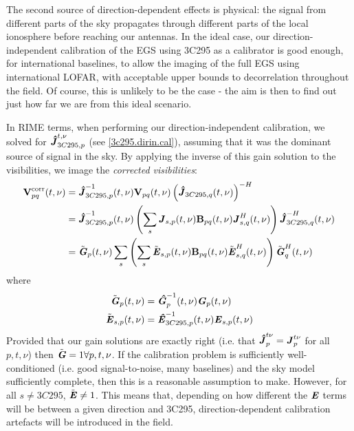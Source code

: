 \pg
The second source of direction-dependent effects is physical: the signal from different parts of the sky propagates through different parts of the local ionosphere before reaching our antennas. In the ideal case, our direction-independent calibration of the EGS using 3C295 as a calibrator is good enough, for international baselines, to allow the imaging of the full EGS using international LOFAR, with acceptable upper bounds to decorrelation throughout the field. Of course, this is unlikely to be the case - the aim is then to find out just how far we are from this ideal scenario.

\pg
In RIME terms, when performing our direction-independent calibration, we solved for $\textbf{\emph{\^{J}}}_{3C295,p}^{t,\nu}$ (see \cref{3c295.dirin.cal}), assuming that it was the dominant source of signal in the sky. By applying the inverse of this gain solution to the visibilities, we image the \textit{corrected visibilities}:
\begin{align}
\textbf{V}_{pq}^\mathrm{corr} (t,\nu) &= \textbf{\emph{\^{J}}}_{3C295,p}^{-1}(t,\nu) \textbf{V}_{pq}(t,\nu) \left(\textbf{\emph{\^{J}}}_{3C295,q}(t,\nu)\right)^{-H}\\
                        &=  \textbf{\emph{\^{J}}}_{3C295,p}^{-1}(t,\nu) \left(\sum_s \textbf{\emph{J}}_{s,p}(t,\nu)\textbf{B}_{pq}(t,\nu) \textbf{\emph{J}}^H_{s,q}(t,\nu)\right) \textbf{\emph{\^{J}}}^{-H}_{3C295,q}(t,\nu)\\
                        &= \tilde{\textbf{\emph{G}}}_{p}(t,\nu) \sum_s \left( \sum_s \tilde{\textbf{\emph{E}}}_{s,p}(t,\nu)\textbf{B}_{pq}(t,\nu) \tilde{\textbf{\emph{E}}}_{s,q}^H(t,\nu)\right) \tilde{\textbf{\emph{G}}}^H_{q}(t,\nu)
\end{align}
where
\begin{align}
\tilde{\textbf{\emph{G}}}_{p}(t,\nu) &= \textbf{\emph{\^{G}}}_{p}^{-1}(t,\nu)\textbf{\emph{G}}_{p}(t,\nu)\\
\tilde{\textbf{\emph{E}}}_{s,p}(t,\nu) &= \textbf{\emph{\^{E}}}_{3C295,p}^{-1}(t,\nu)\textbf{\emph{E}}_{s,p}(t,\nu)
\end{align}                        
Provided that our gain solutions are exactly right (i.e. that $\textbf{\emph{\^{J}}}_p^{t\nu}=\textbf{\emph{J}}_p^{t\nu}$ for all $p,t,\nu$) then $\tilde{\textbf{\emph{G}}}=1 \forall p,t,\nu$. If the calibration problem is sufficiently well-conditioned (i.e. good signal-to-noise, many baselines) and the sky model sufficiently complete, then this is a reasonable assumption to make. However, for all $s\ne 3C295$, $\tilde{\textbf{\emph{E}}}\ne 1$. This means that, depending on how different the $\textbf{\emph{E}}$ terms will be between a given direction and 3C295, direction-dependent calibration artefacts will be introduced in the field. 

